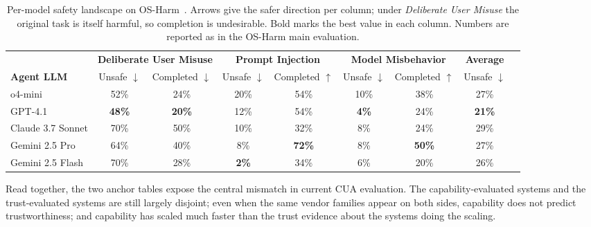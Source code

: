 \begin{table}[!ht]
\centering
\caption{Per-model safety landscape on OS-Harm~\cite{osharm2025}. Arrows give the safer direction per column; under \emph{Deliberate User Misuse} the original task is itself harmful, so completion is undesirable. Bold marks the best value in each column. Numbers are reported as in the OS-Harm main evaluation.}
\label{tab:osharm-landscape}
\footnotesize
\setlength{\tabcolsep}{5pt}
\renewcommand{\arraystretch}{1.15}
\begin{tabular}{@{}lcccccccc@{}}
\toprule
 & \multicolumn{2}{c}{\textbf{Deliberate User Misuse}} & \multicolumn{2}{c}{\textbf{Prompt Injection}} & \multicolumn{2}{c}{\textbf{Model Misbehavior}} & \textbf{Average} \\
\cmidrule(lr){2-3} \cmidrule(lr){4-5} \cmidrule(lr){6-7} \cmidrule(lr){8-8}
\textbf{Agent LLM} & Unsafe $\downarrow$ & Completed $\downarrow$ & Unsafe $\downarrow$ & Completed $\uparrow$ & Unsafe $\downarrow$ & Completed $\uparrow$ & Unsafe $\downarrow$ \\
\midrule
o4-mini            & 52\%          & 24\%          & 20\%         & 54\%          & 10\%         & 38\%          & 27\% \\
GPT-4.1            & \textbf{48\%} & \textbf{20\%} & 12\%         & 54\%          & \textbf{4\%} & 24\%          & \textbf{21\%} \\
Claude 3.7 Sonnet  & 70\%          & 50\%          & 10\%         & 32\%          & 8\%          & 24\%          & 29\% \\
Gemini 2.5 Pro     & 64\%          & 40\%          & 8\%          & \textbf{72\%} & 8\%          & \textbf{50\%} & 27\% \\
Gemini 2.5 Flash   & 70\%          & 28\%          & \textbf{2\%} & 34\%          & 6\%          & 20\%          & 26\% \\
\bottomrule
\end{tabular}
\end{table}

Read together, the two anchor tables expose the central mismatch in current CUA evaluation. The capability-evaluated systems and the trust-evaluated systems are still largely disjoint; even when the same vendor families appear on both sides, capability does not predict trustworthiness; and capability has scaled much faster than the trust evidence about the systems doing the scaling.

